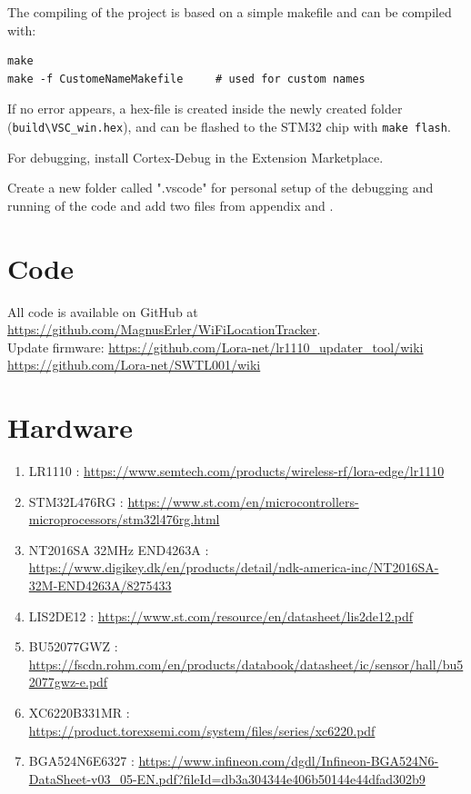 \begin{appendices}
The compiling of the project is based on a simple makefile and can be compiled with:
\begin{lstlisting}[style=bash]
make
make -f CustomeNameMakefile     # used for custom names
\end{lstlisting}
If no error appears, a hex-file is created inside the newly created folder (\lstinline[style=bash]{build\VSC_win.hex}), and can be flashed to the STM32 chip with \lstinline[style=bash]{make flash}.

For debugging, install Cortex-Debug  in the Extension Marketplace.

Create a new folder called ".vscode" for personal setup of the debugging and running of the code and add two files from appendix  and .

\section{Code} \label{app:code}
All code is available on GitHub at \url{https://github.com/MagnusErler/WiFiLocationTracker}.\\
Update firmware: \url{https://github.com/Lora-net/lr1110_updater_tool/wiki}\\
\url{https://github.com/Lora-net/SWTL001/wiki}

\section{Hardware} \label{app:hardware}
\begin{enumerate}
    \item LR1110 : \url{https://www.semtech.com/products/wireless-rf/lora-edge/lr1110} \label{app:hardware:lr1110}
    \item STM32L476RG : \url{https://www.st.com/en/microcontrollers-microprocessors/stm32l476rg.html} \label{app:hardware:stm32l476rg}
    \item NT2016SA 32MHz END4263A : \url{https://www.digikey.dk/en/products/detail/ndk-america-inc/NT2016SA-32M-END4263A/8275433} \label{app:hardware:tcxo}
    \item LIS2DE12 : \url{https://www.st.com/resource/en/datasheet/lis2de12.pdf} \label{app:hardware:lis2de12}
    \item BU52077GWZ : \url{https://fscdn.rohm.com/en/products/databook/datasheet/ic/sensor/hall/bu52077gwz-e.pdf} \label{app:hardware:BU52077GWZ}
    \item XC6220B331MR : \url{https://product.torexsemi.com/system/files/series/xc6220.pdf} \label{app:hardware:XC6220}
    \item BGA524N6E6327 : \url{https://www.infineon.com/dgdl/Infineon-BGA524N6-DataSheet-v03_05-EN.pdf?fileId=db3a304344e406b50144e44dfad302b9} \label{app:hardware:bga524n6e6327}
\end{enumerate}


\end{appendices}
